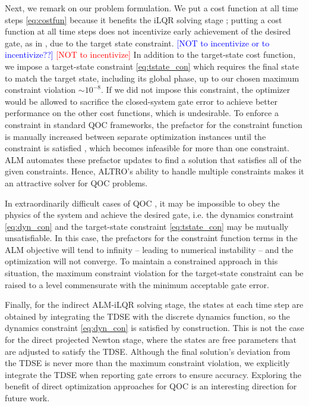 Next, we remark on our problem formulation.
We put a cost function at all time steps \eqref{eq:costfun}
because it benefits the iLQR solving stage \cite{Jackson2020altroc};
putting a cost function at all time steps does not incentivize early achievement
of the desired gate, as in \cite{leung2017speedup}, due to the target state constraint.
\textcolor{blue}{[NOT to incentivize or to incentivize??]}
\textcolor{red}{[NOT to incentivize]}
In addition to the target-state cost function, we
impose a target-state constraint \eqref{eq:tstate_con} which
requires the final state to match the target state, including its global phase,
up to our chosen maximum constraint violation $\sim 10^{-8}$.
If we did not impose this constraint, the optimizer would be
allowed to sacrifice the closed-system gate error to achieve better
performance on the other cost functions, which is undesirable.
To enforce a constraint in standard QOC frameworks,
the prefactor for the constraint function is manually increased
between separate optimization instances until the constraint is satisfied
\cite{heeres2017implementing, leung2017speedup, reinhold2019controlling},
which becomes infeasible for more than one constraint.
ALM automates these prefactor updates to find
a solution that satisfies all of the given constraints.
Hence, ALTRO's ability to handle multiple constraints makes it
an attractive solver for QOC problems.

In extraordinarily difficult cases of
QOC \cite{abdelhafez2020universal}, it may be impossible
to obey the physics of the system and achieve the desired gate, i.e.
the dynamics constraint \eqref{eq:dyn_con}
and the target-state constraint \eqref{eq:tstate_con} may be mutually unsatisfiable.
In this case, the prefactors for the constraint function terms
in the ALM objective will tend to infinity -- leading to numerical instability -- and the
optimization will not converge. To maintain a constrained approach in this situation,
the maximum constraint violation for the target-state constraint can be raised
to a level commensurate with the minimum acceptable gate error.

Finally, for the indirect ALM-iLQR solving stage,
the states at each time step are obtained by integrating
the TDSE with the discrete dynamics function,
so the dynamics constraint \eqref{eq:dyn_con} is satisfied by construction.
This is not the case for the direct projected Newton stage, where the states
are free parameters that are adjusted to satisfy the TDSE.
Although the final solution's deviation from the TDSE is never more than the maximum constraint violation,
we explicitly integrate the TDSE when reporting gate errors to ensure accuracy.
Exploring the benefit of direct optimization approaches for QOC is an interesting direction for future work.
